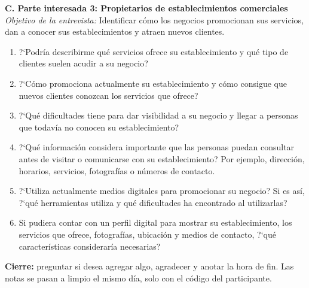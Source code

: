 \documentclass[11pt,a4paper]{article}
\begin{document}
\vspace{3pt}
\noindent\textbf{C. Parte interesada 3: Propietarios de establecimientos comerciales}\\
\textit{Objetivo de la entrevista:} Identificar c\'omo los negocios promocionan sus servicios, dan a conocer sus establecimientos y atraen nuevos clientes.
\begin{enumerate}[label=\textbf{\arabic*.}, leftmargin=1.8em, itemsep=1pt, topsep=2pt, start=15]
    \item ?`Podr\'ia describirme qu\'e servicios ofrece su establecimiento y qu\'e tipo de clientes suelen acudir a su negocio?
    \item ?`C\'omo promociona actualmente su establecimiento y c\'omo consigue que nuevos clientes conozcan los servicios que ofrece?
    \item ?`Qu\'e dificultades tiene para dar visibilidad a su negocio y llegar a personas que todav\'ia no conocen su establecimiento?
    \item ?`Qu\'e informaci\'on considera importante que las personas puedan consultar antes de visitar o comunicarse con su establecimiento? Por ejemplo, direcci\'on, horarios, servicios, fotograf\'ias o n\'umeros de contacto.
    \item ?`Utiliza actualmente medios digitales para promocionar su negocio? Si es as\'i, ?`qu\'e herramientas utiliza y qu\'e dificultades ha encontrado al utilizarlas?
    \item Si pudiera contar con un perfil digital para mostrar su establecimiento, los servicios que ofrece, fotograf\'ias, ubicaci\'on y medios de contacto, ?`qu\'e caracter\'isticas considerar\'ia necesarias?
\end{enumerate}

\vspace{6pt}
\textbf{Cierre:} preguntar si desea agregar algo, agradecer y anotar la hora de fin. Las notas se pasan a limpio el mismo d\'ia, solo con el c\'odigo del participante.
\end{document}
